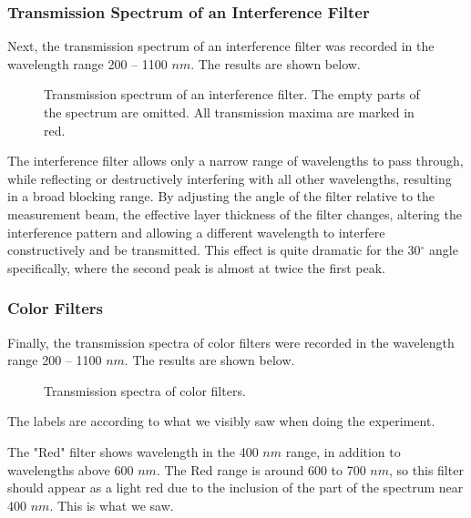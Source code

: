 \documentclass{article}
\begin{document}
\pagebreak{}

\subsubsection{Transmission Spectrum of an Interference Filter}

Next, the transmission spectrum of an interference filter was recorded in the wavelength range 200 -- 1100 $nm$. The results are shown below.

\begin{figure}[h!]
	\centering
	\scalebox{0.70}{}
	\caption{Transmission spectrum of an interference filter. The empty parts of the spectrum are omitted. All transmission maxima are marked in red.}
	\label{fig:Interference}
\end{figure}

The interference filter allows only a narrow range of wavelengths to pass through, while reflecting or destructively interfering with all other wavelengths, resulting in a broad blocking range. By adjusting the angle of the filter relative to the measurement beam, the effective layer thickness of the filter changes, altering the interference pattern and allowing a different wavelength to interfere constructively and be transmitted.
This effect is quite dramatic for the 30$^{\circ}$ angle specifically, where the second peak is almost at twice the first peak. 

\pagebreak{}

\subsubsection{Color Filters}

Finally, the transmission spectra of color filters were recorded in the wavelength range 200 -- 1100 $nm$. The results are shown below.

\begin{figure}[h!]
	\centering
	
	\caption{Transmission spectra of color filters.}
	\label{fig:ColorFilters}
\end{figure}

The labels are according to what we visibly saw when doing the experiment. 

The "Red" filter shows wavelength in the 400 $nm$ range, in addition to wavelengths above 600 $nm$. The Red range is around 600 to 700 $nm$, so this filter should appear as a light red due to the inclusion of the part of the spectrum near 400 $nm$. This is what we saw.
\end{document}
